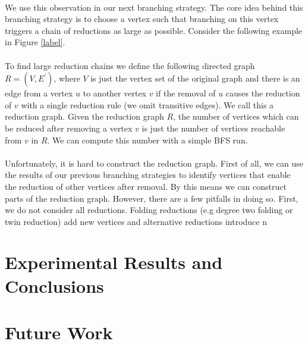 \documentclass[]{article}
\begin{document}
\paragraph{}
We use this observation in our next branching strategy. The core idea behind this branching strategy is to choose a vertex such that branching on this vertex triggers a chain of reductions as large as possible. Consider the following example in Figure \ref{label}. 

\paragraph{}
To find large reduction chains we define the following directed graph $R=(V, E^\prime)$, where $V$ is just the vertex set of the original graph and there is an edge from a vertex $u$ to another vertex $v$ if the removal of $u$ causes the reduction of $v$ with a single reduction rule (we omit transitive edges). We call this a reduction graph. Given the reduction graph $R$, the number of vertices which can be reduced after removing a vertex $v$ is just the number of vertices reachable from $v$ in $R$. We can compute this number with a simple BFS run.

\paragraph{}
Unfortunately, it is hard to construct the reduction graph. First of all, we can use the results of our previous branching strategies to identify vertices that enable the reduction of other vertices after removal. By this means we can construct parts of the reduction graph. However, there are a few pitfalls in doing so. 
First, we do not consider all reductions. Folding reductions (e.g degree two folding or twin reduction) add new vertices and alternative reductions introduce n

\newpage
\section{Experimental Results and Conclusions} \label{sec5}
\section{Future Work} \label{sec6}
\newpage




\end{document}
